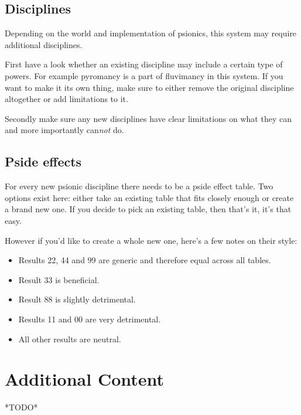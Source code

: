 \documentclass[12pt,a4paper,openany]{book}
\begin{document}
	\section{Disciplines}
	Depending on the world and implementation of psionics, this system may require additional disciplines.\par
	First have a look whether an existing discipline may include a certain type of powers. For example pyromancy is a part of fluvimancy in this system. If you want to make it its own thing, make sure to either remove the original discipline altogether or add limitations to it.\par
	Secondly make sure any new disciplines have clear limitations on what they can and more importantly can\emph{not} do.
	\section{Pside effects}
	For every new psionic discipline there needs to be a pside effect table. Two options exist here: either take an existing table that fits closely enough or create a brand new one. If you decide to pick an existing table, then that's it, it's that easy.\par
	However if you'd like to create a whole new one, here's a few notes on their style:
	\begin{itemize}
		\item Results 22, 44 and 99 are generic and therefore equal across all tables.
		\item Result 33 is beneficial.
		\item Result 88 is slightly detrimental.
		\item Results 11 and 00 are very detrimental.
		\item All other results are neutral.
	\end{itemize}
	
	\chapter{Additional Content}
	\label{ch:addcontent}
	*TODO*
\end{document}
